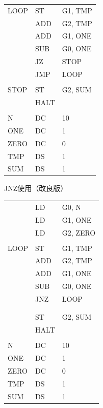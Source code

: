 \documentclass{beamer}                 %
\begin{document}
\begin{frame}
\begin{minipage}{0.36\columnwidth}
{\begin{tabular}{|l|l|l|}
      LOOP    & ST     & G1, TMP  \\
              & ADD    & G2, TMP  \\
              & ADD    & G1, ONE  \\
              & SUB    & G0, ONE  \\
              & JZ     & STOP     \\
              & JMP    & LOOP     \\
              &        &          \\
      STOP    & ST     & G2, SUM  \\
              & HALT   &          \\
              &        &          \\
      N       & DC     & 10       \\
      ONE     & DC     & 1        \\
      ZERO    & DC     & 0        \\
      TMP     & DS     & 1        \\
      SUM     & DS     & 1        \\
    \end{tabular}}
  \end{minipage}
  \begin{minipage}{0.36\columnwidth}
    {\ttfamily JNZ使用（改良版）\\\scriptsize
      \begin{tabular}{|l|l|l|}
              & LD     & G0, N    \\
              & LD     & G1, ONE  \\
              & LD     & G2, ZERO \\
              &        &          \\
      LOOP    & ST     & G1, TMP  \\
              & ADD    & G2, TMP  \\
              & ADD    & G1, ONE  \\
              & SUB    & G0, ONE  \\
              & JNZ    & LOOP     \\
              &        &          \\
              &        &          \\
              & ST     & G2, SUM  \\
              & HALT   &          \\
              &        &          \\
      N       & DC     & 10       \\
      ONE     & DC     & 1        \\
      ZERO    & DC     & 0        \\
      TMP     & DS     & 1        \\
      SUM     & DS     & 1        \\
    \end{tabular}}
  \end{minipage}
  \vfill
\end{frame}
\end{document}
